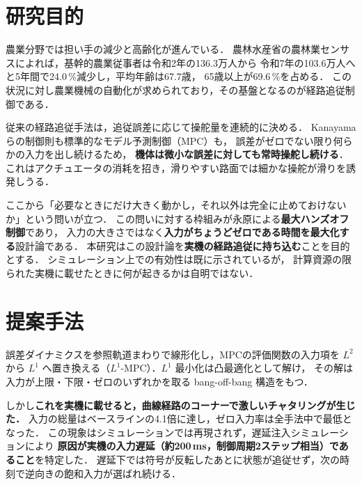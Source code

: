 \documentclass[a4jsme,9pt,dvipdfmx]{jsmepaper_robomec}
\date{}
\begin{document}
\maketitle
\thispagestyle{fancy}
\renewcommand{\headrulewidth}{0pt}
\lhead{}
\rhead{}
\cfoot{}
\small{}

\section{研究目的}
農業分野では担い手の減少と高齢化が進んでいる．
農林水産省の農林業センサスによれば，基幹的農業従事者は令和2年の136.3万人から
令和7年の103.6万人へと5年間で24.0\,\%減少し，平均年齢は67.7歳，
65歳以上が69.6\,\%を占める\cite{maff}．
この状況に対し農業機械の自動化が求められており，その基盤となるのが経路追従制御である．

従来の経路追従手法は，追従誤差に応じて操舵量を連続的に決める．
Kanayamaらの制御則\cite{kanayama}も標準的なモデル予測制御（MPC）も，
誤差がゼロでない限り何らかの入力を出し続けるため，
\textbf{機体は微小な誤差に対しても常時操舵し続ける}．
これはアクチュエータの消耗を招き，滑りやすい路面では細かな操舵が滑りを誘発しうる．

ここから「必要なときにだけ大きく動かし，それ以外は完全に止めておけないか」という問いが立つ．
この問いに対する枠組みが永原による\textbf{最大ハンズオフ制御}\cite{nagahara,nagahara-tac}であり，
入力の大きさではなく\textbf{入力がちょうどゼロである時間を最大化する}設計論である．
本研究はこの設計論を\textbf{実機の経路追従に持ち込む}ことを目的とする．
シミュレーション上での有効性は既に示されているが，
計算資源の限られた実機に載せたときに何が起きるかは自明ではない．

\section{提案手法}
誤差ダイナミクスを参照軌道まわりで線形化し，MPCの評価関数の入力項を
$L^2$ から $L^1$ へ置き換える（$L^1$-MPC）．$L^1$ 最小化は凸最適化として解け，
その解は入力が上限・下限・ゼロのいずれかを取る bang-off-bang 構造をもつ．

しかし\textbf{これを実機に載せると，曲線経路のコーナーで激しいチャタリングが生じた．}
入力の総量はベースラインの4.1倍に達し，ゼロ入力率は全手法中で最低となった．
この現象はシミュレーションでは再現されず，遅延注入シミュレーションにより
\textbf{原因が実機の入力遅延（約200\,ms，制御周期2ステップ相当）であること}を特定した．
遅延下では符号が反転したあとに状態が追従せず，次の時刻で逆向きの飽和入力が選ばれ続ける．
\end{document}
